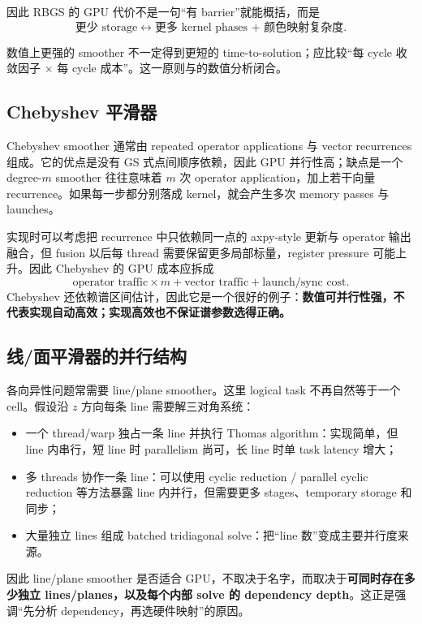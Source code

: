因此 RBGS 的 GPU 代价不是一句“有 barrier”就能概括，而是
\begin{equation}
\boxed{
\text{更少 storage}
\leftrightarrow
\text{更多 kernel phases + 颜色映射复杂度}.
}
\end{equation}

数值上更强的 smoother 不一定得到更短的 time-to-solution；应比较“每 cycle 收敛因子 × 每 cycle 成本”。这一原则与的数值分析闭合。

\subsection{Chebyshev 平滑器}

Chebyshev smoother 通常由 repeated operator applications 与 vector recurrences 组成。它的优点是没有 GS 式点间顺序依赖，因此 GPU 并行性高；缺点是一个 degree-$m$ smoother 往往意味着 $m$ 次 operator application，加上若干向量 recurrence。如果每一步都分别落成 kernel，就会产生多次 memory passes 与 launches。

实现时可以考虑把 recurrence 中只依赖同一点的 axpy-style 更新与 operator 输出融合，但 fusion 以后每 thread 需要保留更多局部标量，register pressure 可能上升。因此 Chebyshev 的 GPU 成本应拆成
\[
\text{operator traffic}\times m
+\text{vector traffic}
+\text{launch/sync cost}.
\]
Chebyshev 还依赖谱区间估计，因此它是一个很好的例子：\textbf{数值可并行性强，不代表实现自动高效；实现高效也不保证谱参数选得正确。}

\subsection{线/面平滑器的并行结构}

各向异性问题常需要 line/plane smoother。这里 logical task 不再自然等于一个 cell。假设沿 $z$ 方向每条 line 需要解三对角系统：
\begin{itemize}
\item 一个 thread/warp 独占一条 line 并执行 Thomas algorithm：实现简单，但 line 内串行，短 line 时 parallelism 尚可，长 line 时单 task latency 增大；
\item 多 threads 协作一条 line：可以使用 cyclic reduction / parallel cyclic reduction 等方法暴露 line 内并行，但需要更多 stages、temporary storage 和同步；
\item 大量独立 lines 组成 batched tridiagonal solve：把“line 数”变成主要并行度来源。
\end{itemize}
因此 line/plane smoother 是否适合 GPU，不取决于名字，而取决于\textbf{可同时存在多少独立 lines/planes，以及每个内部 solve 的 dependency depth}。这正是强调“先分析 dependency，再选硬件映射”的原因。

